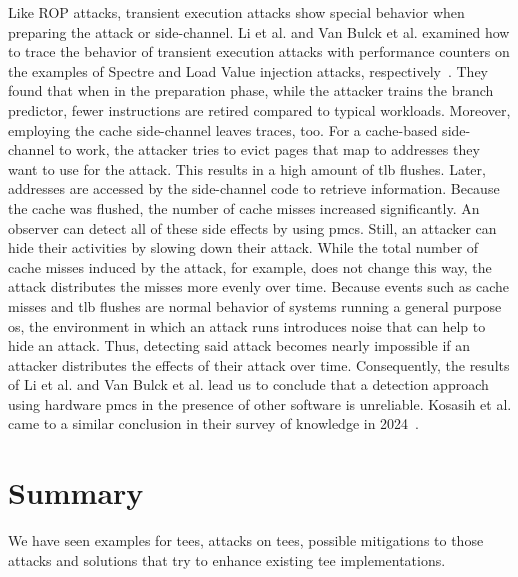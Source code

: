 Like ROP attacks, transient execution attacks show special behavior when
preparing the attack or side-channel. Li et al. and Van Bulck et al. examined
how to trace the behavior of transient execution attacks with performance
counters on the examples of Spectre and Load Value injection attacks,
respectively~\cite{li_detecting_2021, van_bulck_lvi_2020}. They found that when
in the preparation phase, while the attacker trains the branch predictor, fewer
instructions are retired compared to typical workloads. Moreover, employing the
cache side-channel leaves traces, too. For a cache-based side-channel to work,
the attacker tries to evict pages that map to addresses they want to use for the
attack. This results in a high amount of \gls{tlb} flushes. Later, addresses are
accessed by the side-channel code to retrieve information. Because the cache was
flushed, the number of cache misses increased significantly. An observer can
detect all of these side effects by using \glspl{pmc}. Still, an attacker can
hide their activities by slowing down their attack. While the total number of
cache misses induced by the attack, for example, does not change this way, the
attack distributes the misses more evenly over time. Because events such as
cache misses and \gls{tlb} flushes are normal behavior of systems running a
general purpose \gls{os}, the environment in which an attack runs introduces
noise that can help to hide an attack. Thus, detecting said attack becomes
nearly impossible if an attacker distributes the effects of their attack over
time. Consequently, the results of Li et al. and Van Bulck et al. lead us to
conclude that a detection approach using hardware \glspl{pmc} in the presence of
other software is unreliable. Kosasih et al. came to a similar conclusion in
their survey of knowledge in 2024~\cite{kosasih2024sok}.

\section{Summary}
\label{sec:20:summary}
We have seen examples for \glspl{tee}, attacks on \glspl{tee}, possible
mitigations to those attacks and solutions that try to enhance existing
\gls{tee} implementations. \\

